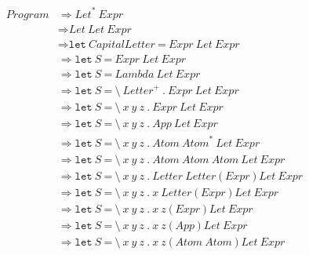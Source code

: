 \documentclass[a4paper,12pt]{article}
\begin{document}
\[
\begin{aligned}
\textit{Program}
&\Longrightarrow \textit{Let}^{*}\ \textit{Expr}\\
&\Longrightarrow \textit{Let}\ \textit{Let}\ \textit{Expr}\\
&\Longrightarrow \texttt{let}\ \textit{CapitalLetter}\ \texttt{=}\ \textit{Expr}\ \textit{Let}\ \textit{Expr}\\
&\Longrightarrow \texttt{let}\ S\ \texttt{=}\ \textit{Expr}\ \textit{Let}\ \textit{Expr}\\
&\Longrightarrow \texttt{let}\ S\ \texttt{=}\ \textit{Lambda}\ \textit{Let}\ \textit{Expr}\\
&\Longrightarrow \texttt{let}\ S\ \texttt{=}\ \texttt{\textbackslash}\ \textit{Letter}^{+}\ \texttt{.}\ \textit{Expr}\ \textit{Let}\ \textit{Expr}\\
&\Longrightarrow \texttt{let}\ S\ \texttt{=}\ \texttt{\textbackslash}\ x\ y\ z\ \texttt{.}\ \textit{Expr}\ \textit{Let}\ \textit{Expr}\\
&\Longrightarrow \texttt{let}\ S\ \texttt{=}\ \texttt{\textbackslash}\ x\ y\ z\ \texttt{.}\ \textit{App}\ \textit{Let}\ \textit{Expr}\\
&\Longrightarrow \texttt{let}\ S\ \texttt{=}\ \texttt{\textbackslash}\ x\ y\ z\ \texttt{.}\ \textit{Atom}\ \textit{Atom}^{*}\ \textit{Let}\ \textit{Expr}\\
&\Longrightarrow \texttt{let}\ S\ \texttt{=}\ \texttt{\textbackslash}\ x\ y\ z\ \texttt{.}\ \textit{Atom}\ \textit{Atom}\ \textit{Atom}\ \textit{Let}\ \textit{Expr}\\
&\Longrightarrow \texttt{let}\ S\ \texttt{=}\ \texttt{\textbackslash}\ x\ y\ z\ \texttt{.}\ \textit{Letter}\ \textit{Letter}\ \texttt{(}\ \textit{Expr}\ \texttt{)}\ \textit{Let}\ \textit{Expr}\\
&\Longrightarrow \texttt{let}\ S\ \texttt{=}\ \texttt{\textbackslash}\ x\ y\ z\ \texttt{.}\ x\ \textit{Letter}\ \texttt{(}\ \textit{Expr}\ \texttt{)}\ \textit{Let}\ \textit{Expr}\\
&\Longrightarrow \texttt{let}\ S\ \texttt{=}\ \texttt{\textbackslash}\ x\ y\ z\ \texttt{.}\ x\ z\ \texttt{(}\ \textit{Expr}\ \texttt{)}\ \textit{Let}\ \textit{Expr}\\
&\Longrightarrow \texttt{let}\ S\ \texttt{=}\ \texttt{\textbackslash}\ x\ y\ z\ \texttt{.}\ x\ z\ \texttt{(}\ \textit{App}\ \texttt{)}\ \textit{Let}\ \textit{Expr}\\
&\Longrightarrow \texttt{let}\ S\ \texttt{=}\ \texttt{\textbackslash}\ x\ y\ z\ \texttt{.}\ x\ z\ \texttt{(}\ \textit{Atom}\ \textit{Atom}\ \texttt{)}\ \textit{Let}\ \textit{Expr}\\

\end{aligned}\]
\end{document}
